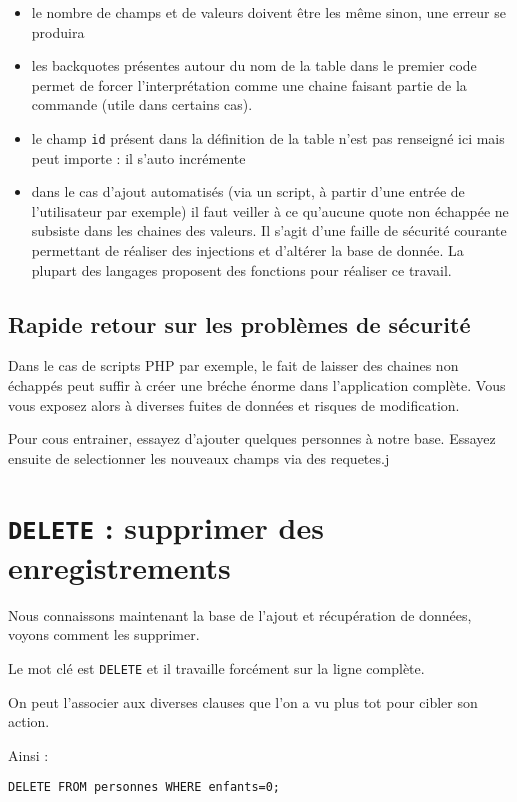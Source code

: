 \documentclass[a4paper, 11pt]{report}
\begin{document}
\begin{itemize}
    \item le nombre de champs et de valeurs doivent être les même sinon, une erreur se produira
    \item les backquotes présentes autour du nom de la table dans le premier code permet de forcer l'interprétation
        comme une chaine faisant partie de la commande (utile dans certains cas).
    \item le champ \texttt{id} présent dans la définition de la table n'est pas renseigné ici mais peut importe : il
        s'auto incrémente
    \item dans le cas d'ajout automatisés (via un script, à partir d'une entrée de l'utilisateur par exemple) il faut
        veiller à ce qu'aucune quote non échappée ne subsiste dans les chaines des valeurs. Il s'agit d'une faille de
        sécurité courante permettant de réaliser des injections et d'altérer la base de donnée. La plupart des langages
        proposent des fonctions pour réaliser ce travail.
\end{itemize}

\subsection{Rapide retour sur les problèmes de sécurité}

Dans le cas de scripts PHP par exemple, le fait de laisser des chaines non échappés peut suffir à créer une bréche
énorme dans l'application complète. Vous vous exposez alors à diverses fuites de données et risques de modification.

Pour cous entrainer, essayez d'ajouter quelques personnes à notre base. Essayez ensuite de selectionner les nouveaux
champs via des requetes.j
\section{\texttt{DELETE} : supprimer des enregistrements}

Nous connaissons maintenant la base de l'ajout et récupération de données, voyons comment les supprimer.

Le mot clé est \texttt{DELETE} et il travaille forcément sur la ligne complète.

On peut l'associer aux diverses clauses que l'on a vu plus tot pour cibler son action.

Ainsi :

\begin{verbatim}
DELETE FROM personnes WHERE enfants=0;
\end{verbatim}
\end{document}
